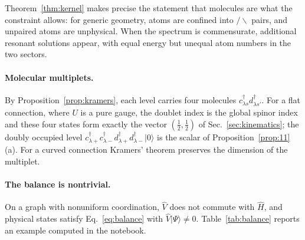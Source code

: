\documentclass[reprint,aps,prd,amsmath,amssymb,superscriptaddress,nofootinbib,floatfix]{revtex4-2}
\theoremstyle{plain}
\theoremstyle{definition}
\theoremstyle{remark}
\newcommand{\Lat}{\ensuremath{/}}                 %
\newcommand{\Rat}{\ensuremath{\backslash}}        %
\newcommand{\ket}[1]{\ensuremath{|#1\rangle}}
\newcommand{\Hc}{\hat{H}}
\newcommand{\Vc}{\hat{V}}
\begin{document}
Theorem~\ref{thm:kernel} makes precise the statement that molecules are what the constraint allows: for
generic geometry, atoms are confined into $\Lat\Rat$ pairs, and unpaired atoms are unphysical. When the
spectrum is commensurate, additional resonant solutions appear, with equal energy but unequal atom
numbers in the two sectors.

\paragraph*{Molecular multiplets.} By Proposition~\ref{prop:kramers}, each level carries four molecules
$c^\dagger_{\lambda s}d^\dagger_{\lambda s'}$. For a flat connection, where $U$ is a pure gauge, the doublet index is
the global spinor index and these four states form exactly the vector $(\tfrac12,\tfrac12)$ of
Sec.~\ref{sec:kinematics}; the doubly occupied level $c^\dagger_{\lambda+}c^\dagger_{\lambda-}d^\dagger_{\lambda+}d^\dagger_{\lambda-}\ket0$ is the scalar of
Proposition~\ref{prop:11}(a). For a curved connection Kramers' theorem preserves the dimension of the multiplet.

\paragraph*{The balance is nontrivial.} On a graph with nonuniform coordination, $\Vc$ does not commute with
$\Hc$, and physical states satisfy Eq.~\eqref{eq:balance} with $\Vc\ket\Psi\neq0$. Table~\ref{tab:balance}
reports an example computed in the notebook.
\end{document}
